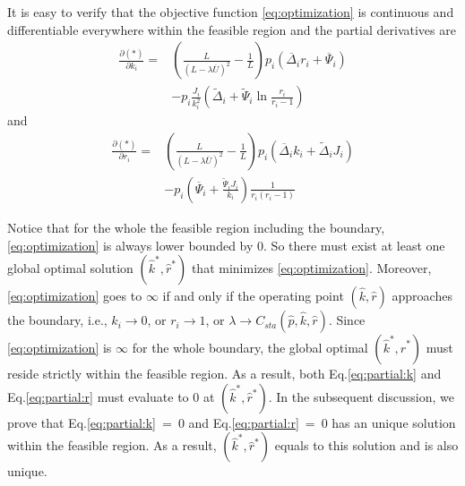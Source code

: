 \documentclass[journal]{IEEEtran}
\newcommand{\comment}[1]{}
\newcommand{\dimVec}{\hat{k}}
\newcommand{\compVec}{\hat{p}}
\newcommand{\rateVec}{\hat{r}}
\newcommand{\CapSta}{C_{sta}}
\newcommand{\aveUsage}{\overline{U}}
\newcommand{\fixedDelta}{\overline{\Delta}}
\newcommand{\linearDelta}{\widetilde{\Delta}}
\newcommand{\fixedExp}{\overline{\Psi}}
\newcommand{\linearExp}{\widetilde{\Psi}}
\newcommand{\optSolution}{$(\dimVec^*,\rateVec^*)$\xspace}
\begin{document}
\begin{IEEEproof}
\comment{
It is easy to verify that within the feasible region
\begin{align}
\frac{\partial D_q}{\partial \aveUsage}
&=\frac{L}{(L-\lambda \aveUsage)^2} - \frac{1}{L},
\\
\frac{\partial \aveUsage}{\partial k_i}
& = p_i (\fixedDelta_i r_i + \fixedExp_i ),
\\
\frac{\partial \aveUsage}{\partial r_i} 
&= p_i (\fixedDelta_i k_i + \linearDelta_i J_i ),
\\
\frac{\partial D_{s,i}}{\partial k_i}
&= 
-\frac{J_i}{k_i^2}\left(\linearDelta_i + \linearExp_i\ln\frac{r_i}{r_i-1}\right),
\\
\frac{\partial D_{s,i}}{\partial r_i}
&= 
-\left(\fixedExp_i + \frac{\linearExp_i J_i}{k_i}\right)\frac{1}{r_i(r_i-1)}.
\end{align}
}
It is easy to verify that the objective function \eqref{eq:optimization} is continuous and differentiable everywhere within the feasible region and the partial derivatives are 
\begin{align}
\frac{\partial (\ast)}{\partial k_i} 
=& \left(\frac{L}{(L-\lambda \aveUsage)^2} - \frac{1}{L}\right) p_i (\fixedDelta_i r_i + \fixedExp_i ) 
\nonumber\\ 
& - p_i \frac{J_i}{k_i^2}\left(\linearDelta_i + \linearExp_i\ln\frac{r_i}{r_i-1}\right)
\label{eq:partial:k}
\end{align}
and 
\begin{align}
\frac{\partial (\ast)}{\partial r_i} 
=& \left(\frac{L}{(L-\lambda \aveUsage)^2} - \frac{1}{L}\right) p_i (\fixedDelta_i k_i + \linearDelta_i J_i )
\nonumber\\
& - p_i\left(\fixedExp_i + \frac{\linearExp_i J_i}{k_i}\right)\frac{1}{r_i(r_i-1)}
\label{eq:partial:r}
\end{align}

Notice that for the whole the feasible region including the boundary, \eqref{eq:optimization} is always lower bounded by 0. So there must exist at least one global optimal solution \optSolution that minimizes \eqref{eq:optimization}. Moreover, \eqref{eq:optimization} goes to $\infty$ if and only if the operating point $(\dimVec,\rateVec)$ approaches the boundary, i.e., $k_i \rightarrow 0$, or $r_i \rightarrow 1$, or $\lambda \rightarrow \CapSta(\compVec,\dimVec,\rateVec)$. Since \eqref{eq:optimization} is $\infty$ for the whole boundary, the global optimal \optSolution must reside strictly within the feasible region. As a result, both Eq.\ref{eq:partial:k} and Eq.\ref{eq:partial:r} must evaluate to 0 at \optSolution. 
In the subsequent discussion, we prove that Eq.\ref{eq:partial:k}~=~0 and Eq.\ref{eq:partial:r}~=~0 has an unique solution within the feasible region. As a result, \optSolution equals to this solution and is also unique.



\end{IEEEproof}
\end{document}
